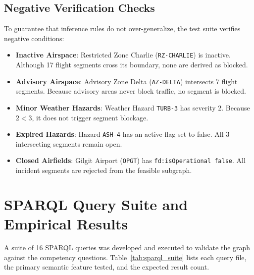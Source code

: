 \documentclass[conference]{IEEEtran}
\begin{document}
\subsection{Negative Verification Checks}
To guarantee that inference rules do not over-generalize, the test suite verifies negative conditions:
\begin{itemize}
    \item \textbf{Inactive Airspace}: Restricted Zone Charlie (\texttt{RZ-CHARLIE}) is inactive. Although 17 flight segments cross its boundary, none are derived as blocked.
    \item \textbf{Advisory Airspace}: Advisory Zone Delta (\texttt{AZ-DELTA}) intersects 7 flight segments. Because advisory areas never block traffic, no segment is blocked.
    \item \textbf{Minor Weather Hazards}: Weather Hazard \texttt{TURB-3} has severity 2. Because $2 < 3$, it does not trigger segment blockage.
    \item \textbf{Expired Hazards}: Hazard \texttt{ASH-4} has an active flag set to false. All 3 intersecting segments remain open.
    \item \textbf{Closed Airfields}: Gilgit Airport (\texttt{OPGT}) has \texttt{fd:isOperational false}. All incident segments are rejected from the feasible subgraph.
\end{itemize}

\section{SPARQL Query Suite and Empirical Results}

A suite of 16 SPARQL queries was developed and executed to validate the graph against the competency questions. Table~\ref{tab:sparql_suite} lists each query file, the primary semantic feature tested, and the expected result count.
\end{document}
